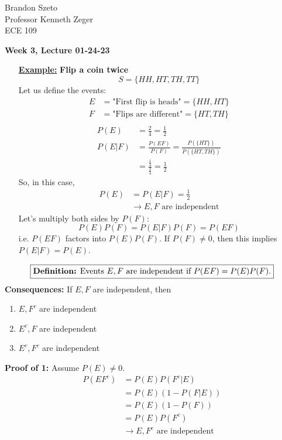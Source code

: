 \documentclass[10pt]{article}
\begin{document}
\begin{flushleft}
    Brandon Szeto \\
    Professor Kenneth Zeger \\
	ECE 109 \\
\end{flushleft}

\begin{center}
	\Large \textbf{Week 3, Lecture 01-24-23}
\end{center}
\normalsize

\begin{flushleft}

\begin{itemize}
    \item[\textbf{\underline{Example:}}] \textbf{Flip a coin twice}
        $$ S = \{HH, HT, TH, TT\} $$
        Let us define the events:
        $$ \begin{aligned}
            E &= \text{"First flip is heads"} = \{HH, HT\} \\
            F &= \text{"Flips are different"} = \{HT, TH\} \\
        \end{aligned} $$
        $$ \begin{aligned}
            P(E) &= \frac{2}{4} = \frac{1}{2} \\
            P(E|F) &= \frac{P(EF)}{P(F)} = \frac{P(\{HT\})}{P(\{HT, TH\})} \\
                   &= \frac{\frac{1}{4}}{\frac{2}{4}} = \frac{1}{2}
        \end{aligned} $$
        So, in this case,
        $$ \begin{aligned}
            P(E) &= P(E|F) = \frac{1}{2} \\
                 &\rightarrow E, F \text{ are independent} 
        \end{aligned} $$
        Let's multiply both sides by $P(F)$:
        $$ P(E)P(F) = P(E|F)P(F) = P(EF) $$
        i.e. $P(EF)$ factors into $P(E)P(F)$. If $P(F) \neq 0$, then this implies $P(E|F) = P(E)$.
\end{itemize}
        $$\boxed{ \text{\textbf{Definition:} Events } E, F \text{ are independent
            if }
        P(EF) = P(E)P(F). }$$
        \textbf{Consequences:} If $E,F$ are independent, then
        \begin{enumerate}
            \item $E, F^c$ are independent
            \item $E^c, F$ are independent
            \item $E^c, F^c$ are independent
        \end{enumerate}
        \textbf{Proof of 1:} Assume $P(E) \neq 0$.
        $$ \begin{aligned} 
            P(EF^c) &= P(E)P(F^c|E) \\
                    &= P(E)(1 - P(F|E)) \\
                    &= P(E)(1 - P(F)) \\
                    &= P(E)P(F^c) \\
                    &\rightarrow E, F^c \text{ are independent}
        \end{aligned}$$


\end{flushleft}
\end{document}
